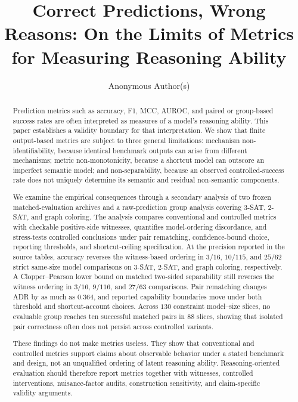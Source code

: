 \documentclass[acmsmall,screen,review,anonymous]{acmart}
\begin{document}

\title{Correct Predictions, Wrong Reasons: On the Limits of Metrics for Measuring Reasoning Ability}

\author{Anonymous Author(s)}

\begin{abstract}
Prediction metrics such as accuracy, F1, MCC, AUROC, and paired or
group-based success rates are often interpreted as measures of a model's
reasoning ability. This paper establishes a validity boundary for that
interpretation. We show that finite output-based metrics are subject to three
general limitations: mechanism non-identifiability, because identical
benchmark outputs can arise from different mechanisms; metric
non-monotonicity, because a shortcut model can outscore an imperfect semantic
model; and non-separability, because an observed controlled-success rate does
not uniquely determine its semantic and residual non-semantic components.

We examine the empirical consequences through a secondary analysis of two
frozen matched-evaluation archives and a raw-prediction group analysis
covering 3-SAT, 2-SAT, and graph coloring. The
analysis compares conventional and controlled
metrics with checkable positive-side witnesses, quantifies model-ordering
discordance, and stress-tests controlled conclusions under pair rematching,
confidence-bound choice, reporting thresholds, and shortcut-ceiling
specification. At the precision reported in the source tables, accuracy
reverses the witness-based ordering in \(3/16\), \(10/115\), and \(25/62\)
strict same-size model comparisons on 3-SAT, 2-SAT, and graph coloring,
respectively. A Clopper--Pearson lower bound on matched two-sided
separability still reverses the witness ordering in \(3/16\), \(9/116\), and
\(27/63\) comparisons. Pair
rematching changes ADR by as much as \(0.364\), and reported capability
boundaries move under both threshold and shortcut-account choices. Across
\(130\) constraint model--size slices, no evaluable group reaches ten
successful matched pairs in \(88\) slices, showing that isolated pair
correctness often does not persist across controlled variants.

These findings do not make metrics useless. They show that conventional and
controlled metrics support claims about observable behavior under a stated
benchmark and design, not an unqualified ordering of latent reasoning
ability. Reasoning-oriented evaluation should therefore report metrics
together with witnesses, controlled interventions, nuisance-factor audits,
construction sensitivity, and claim-specific validity arguments.
\end{abstract}
\end{document}
